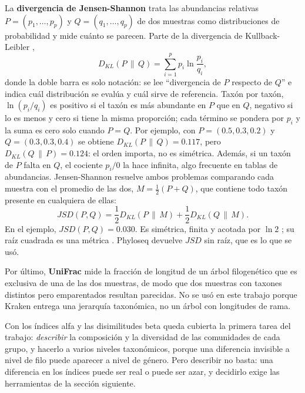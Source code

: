 La \textbf{divergencia de Jensen-Shannon} trata las abundancias relativas $P = (p_1, \dots, p_p)$
y $Q = (q_1, \dots, q_p)$ de dos muestras como distribuciones de probabilidad y mide cuánto se
parecen. Parte de la divergencia de Kullback-Leibler \citep{kullback1951information},
\begin{equation}
D_{KL}(P \,\|\, Q) = \sum_{i=1}^{p} p_i \ln \frac{p_i}{q_i},
\label{eq:kullback-leibler}
\end{equation}
donde la doble barra es solo notación: se lee ``divergencia de $P$ respecto de $Q$'' e indica cuál
distribución se evalúa y cuál sirve de referencia. Taxón por taxón, $\ln(p_i / q_i)$ es positivo si
el taxón es más abundante en $P$ que en $Q$, negativo si lo es menos y cero si tiene la misma
proporción; cada término se pondera por $p_i$ y la suma es cero solo cuando $P = Q$. Por ejemplo,
con $P = (0.5, 0.3, 0.2)$ y $Q = (0.3, 0.3, 0.4)$ se obtiene $D_{KL}(P \,\|\, Q) = 0.117$, pero
$D_{KL}(Q \,\|\, P) = 0.124$: el orden importa, no es simétrica. Además, si un taxón de $P$ falta en
$Q$, el cociente $p_i/0$ la hace infinita, algo frecuente en tablas de abundancias. Jensen-Shannon
resuelve ambos problemas comparando cada muestra con el promedio de las dos,
$M = \frac{1}{2}(P + Q)$, que contiene todo taxón presente en cualquiera de ellas:
\begin{equation}
JSD(P, Q) = \frac{1}{2} D_{KL}(P \,\|\, M) + \frac{1}{2} D_{KL}(Q \,\|\, M).
\label{eq:jensen-shannon}
\end{equation}
En el ejemplo, $JSD(P, Q) = 0.030$. Es simétrica, finita y acotada por $\ln 2$
\citep{lin1991divergence}; su raíz cuadrada es una métrica \citep{endres2003new}. Phyloseq devuelve
$JSD$ sin raíz, que es lo que se usó.

Por último, \textbf{UniFrac} \citep{lozupone2008species} mide la fracción de longitud de un árbol
filogenético que es exclusiva de una de las dos muestras, de modo que dos muestras con taxones
distintos pero emparentados resultan parecidas. No se usó en este trabajo porque Kraken entrega una
jerarquía taxonómica, no un árbol con longitudes de rama.

Con los índices alfa y las disimilitudes beta queda cubierta la primera tarea del trabajo:
\emph{describir} la composición y la diversidad de las comunidades de cada grupo, y hacerlo a
varios niveles taxonómicos, porque una diferencia invisible a nivel de filo puede aparecer a nivel de
género. Pero describir no basta: una diferencia en los índices puede ser real o puede ser azar, y
decidirlo exige las herramientas de la sección siguiente.

